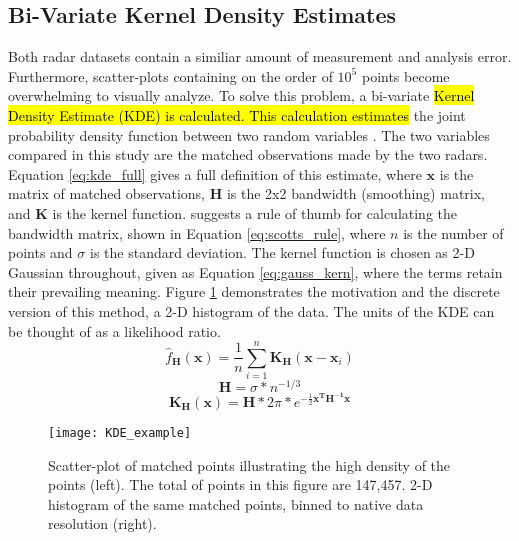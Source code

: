 \subsection{Bi-Variate Kernel Density Estimates}
Both radar datasets contain a similiar amount of measurement and analysis error. Furthermore, scatter-plots containing on the order of $10^5$ points become
overwhelming to visually analyze. To solve this problem, a bi-variate \hl{Kernel Density Estimate (KDE) is calculated. This calculation estimates} the joint probability density function between two random variables \citep{Silverman1986}. The two variables compared in this study are the matched
observations made by the two radars. Equation \ref{eq:kde_full} gives a full definition of this estimate, where $\mathbf{x}$ is the matrix of matched
observations, $\mathbf{H}$ is the 2x2 bandwidth (smoothing) matrix, and $\mathbf{K}$ is the kernel function. \citet{Scott1992} suggests a rule of thumb for
calculating the bandwidth matrix, shown in Equation \ref{eq:scotts_rule}, where $n$ is the number of points and $\sigma$ is the standard deviation. The
kernel function is chosen as 2-D Gaussian throughout, given as Equation \ref{eq:gauss_kern}, where the terms retain their prevailing meaning. Figure
\ref{fig:KDE_example} demonstrates the motivation and the discrete version of this method, a 2-D histogram of the data. The units of the KDE can be thought
of as a likelihood ratio.
\\
\begin{equation}\label{eq:kde_full}
\hat{f}_{\mathbf{H}}(\mathbf{x}) = \frac{1}{n} \sum_{i=1}^{n} \mathbf{K_H}(\mathbf{x} - \mathbf{x}_i)
\end{equation}
\begin{equation}\label{eq:scotts_rule}
\mathbf{H} = \sigma * n^{-1/3}
\end{equation}
\begin{equation}\label{eq:gauss_kern}
\mathbf{K_H}(\textbf{x}) = \mathbf{H} * 2\pi * e^{-\frac{1}{2} \mathbf{x^T} \mathbf{H^{-1}} \mathbf{x}}
\end{equation}
\begin{figure}
\texttt{[image: KDE\_example]}\centering
\caption{Scatter-plot of matched points illustrating the high density of the points (left). The total of points in this figure are 147,457. 2-D histogram of
the same matched points, binned to native data resolution (right).} 
\label{fig:KDE_example}
\end{figure}

